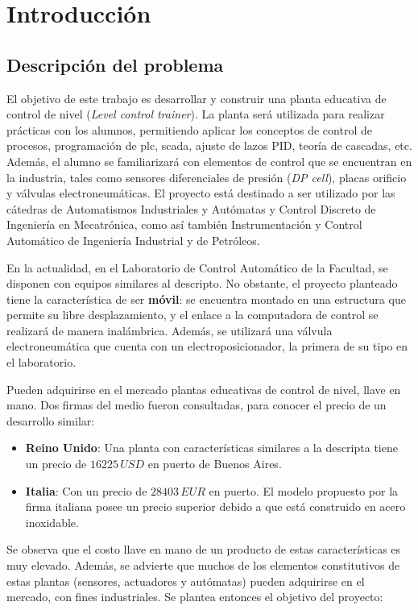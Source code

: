 \chapter{Introducción}
\label{ch:intro}

\section{Descripción del problema}
\label{sec:DescripcionProblema}
El objetivo de este trabajo es desarrollar y construir una planta
educativa de control de nivel
(\textit{Level control trainer}).
La planta será utilizada para realizar prácticas con los
alumnos, permitiendo aplicar los conceptos de
control de procesos, programación de \gls{plc}, \gls{scada},
ajuste de lazos PID, teoría de cascadas, etc.
Además, el alumno se familiarizará con elementos de control que
se encuentran en la industria, tales como sensores diferenciales de presión
(\textit{DP cell}), placas orificio y válvulas electroneumáticas.
El proyecto está destinado a ser utilizado por las cátedras de
Automatismos Industriales y Autómatas y Control Discreto de
Ingeniería en Mecatrónica,
como así también Instrumentación y Control Automático de Ingeniería Industrial
y de Petróleos.

En la actualidad, en el Laboratorio de Control Automático de la Facultad, 
se disponen con equipos similares al descripto.
No obstante, el proyecto planteado tiene la característica de ser 
\textbf{móvil}: se encuentra montado en una estructura que 
permite su libre desplazamiento, y el enlace a la
computadora de control se realizará de manera inalámbrica.
Además, se utilizará una válvula electroneumática que cuenta con un
electroposicionador, la primera de su tipo en el laboratorio.

Pueden adquirirse en el mercado plantas educativas de control de nivel, llave
en mano.
Dos firmas del medio fueron consultadas, para conocer 
el precio de un desarrollo similar:
\begin{itemize}
 \item \textbf{Reino Unido}: Una planta con características similares
 a la descripta tiene un precio de $16225\,USD$ en puerto de Buenos Aires.
 \item \textbf{Italia}: Con un precio de $28403\,EUR$ en puerto. 
 El modelo propuesto por la firma italiana
 posee un precio superior debido a que está construido en acero inoxidable.
\end{itemize}

Se observa que el costo llave en mano de un producto de estas características
es muy elevado.
Además, se advierte que muchos de los elementos constitutivos de estas plantas
(sensores, actuadores y autómatas) pueden adquirirse en el mercado, con fines
industriales.
Se plantea entonces el objetivo del proyecto:

